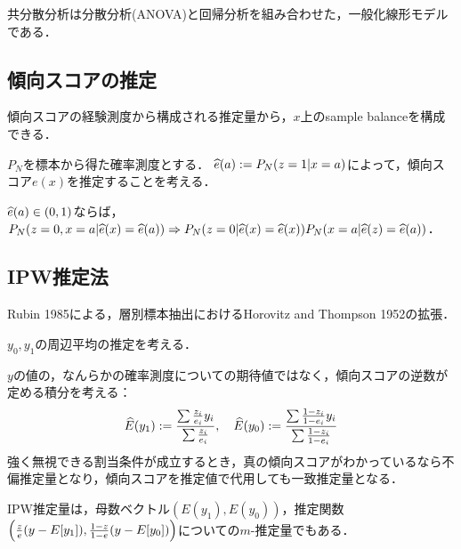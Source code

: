 \documentclass[uplatex,dvipdfmx]{jsreport}
\begin{document}
\begin{corollary}
    
\end{corollary}

\begin{corollary}
    
\end{corollary}
\begin{remark}
    共分散分析は分散分析(ANOVA)と回帰分析を組み合わせた，一般化線形モデルである．
\end{remark}

\subsection{傾向スコアの推定}

\begin{tcolorbox}[colframe=ForestGreen, colback=ForestGreen!10!white,breakable,colbacktitle=ForestGreen!40!white,coltitle=black,fonttitle=\bfseries\sffamily,
title=]
    傾向スコアの経験測度から構成される推定量から，$x$上のsample balanceを構成できる．
\end{tcolorbox}

\begin{definition}
    $P_N$を標本から得た確率測度とする．
    $\widehat{e}(a):=P_N(z=1|x=a)$によって，傾向スコア$e(x)$を推定することを考える．
\end{definition}

\begin{theorem}
    $\widehat{e}(a)\in(0,1)$ならば，$P_N(z=0,x=a|\widehat{e}(x)=\widehat{e}(a))\Rightarrow P_N(z=0|\widehat{e}(x)=\widehat{e}(x))P_N(x=a|\widehat{e}(z)=\widehat{e}(a))$．
\end{theorem}

\subsection{IPW推定法}

\begin{tcolorbox}[colframe=ForestGreen, colback=ForestGreen!10!white,breakable,colbacktitle=ForestGreen!40!white,coltitle=black,fonttitle=\bfseries\sffamily,
title=]
    Rubin 1985による，層別標本抽出におけるHorovitz and Thompson 1952の拡張．
\end{tcolorbox}

\begin{definition}
    $y_0,y_1$の周辺平均の推定を考える．

    $y$の値の，なんらかの確率測度についての期待値ではなく，傾向スコアの逆数が定める積分を考える：
    \[\widehat{E}(y_1):=\frac{\sum\frac{z_i}{e_i}y_i}{\sum\frac{z_i}{e_i}},\quad\widehat{E}(y_0):=\frac{\sum\frac{1-z_i}{1-e_i}y_i}{\sum\frac{1-z_i}{1-e_i}}\]
    強く無視できる割当条件が成立するとき，真の傾向スコアがわかっているなら不偏推定量となり，傾向スコアを推定値で代用しても一致推定量となる．
\end{definition}
\begin{remark}
    IPW推定量は，母数ベクトル$(E(y_1),E(y_0))$，推定関数$\left(\frac{z}{e}(y-E[y_1]),\frac{1-z}{1-e}(y-E[y_0])\right)$についての$m$-推定量でもある．
\end{remark}
\end{document}
